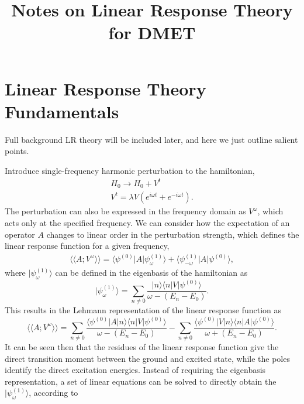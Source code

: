 \documentclass[a4paper,oneside,11pt]{article}
\numberwithin{equation}{section}
\begin{document}
\title{Notes on Linear Response Theory for DMET}
\date{}
\maketitle

\section{Linear Response Theory Fundamentals}
Full background LR theory will be included later, and here we just outline salient points.

Introduce single-frequency harmonic perturbation to the hamiltonian,
\begin{eqnarray}
H_0 \rightarrow H_0 + V^t \\
V^t = \lambda V (e^{i \omega t}+e^{-i \omega t}) .
\end{eqnarray}
The perturbation can also be expressed in the frequency domain as $V^{\omega}$, which acts only at the specified frequency.
We can consider how the expectation of an operator $A$ changes to linear order in the perturbation strength, which defines
the linear response function for a given frequency,
\begin{eqnarray}
\langle \langle A ; V^{\omega} \rangle \rangle = \langle \psi^{(0)} | A | \psi^{(1)}_{\omega} \rangle + \langle \psi^{(1)}_{-\omega} | A | \psi^{(0)} \rangle  ,   \label{LRFunc}
\end{eqnarray}
where $|\psi^{(1)}_{\omega}\rangle$ can be defined in the eigenbasis of the hamiltonian as
\begin{equation}
| \psi^{(1)}_{\omega} \rangle = \sum_{n \neq 0} \frac{ | n \rangle \langle n | V | \psi^{(0)} \rangle}{\omega - (E_n - E_0)} .
\end{equation}
This results in the Lehmann representation of the linear response function as
\begin{equation}
\langle \langle A ; V^{\omega} \rangle \rangle = \sum_{n \neq 0} \frac{\langle \psi^{(0)} | A | n \rangle \langle n | V | \psi^{(0)} \rangle}{\omega - (E_n - E_0)} - \sum_{n \neq 0} \frac{\langle \psi^{(0)} | V | n \rangle \langle n | A | \psi^{(0)} \rangle}{\omega + (E_n - E_0)} .  \label{Lehmann}
\end{equation}
It can be seen then that the residues of the linear response function give the direct transition moment between the ground and excited state, while the poles identify the direct excitation energies.
Instead of requiring the eigenbasis representation, a set of linear equations can be solved to directly obtain the $|\psi^{(1)}_{\omega}\rangle$, according to
\end{document}
